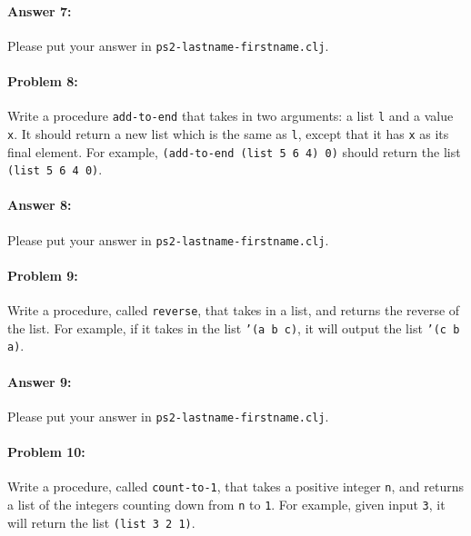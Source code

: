 \documentclass[10pt]{article}
\newcommand{\PSnum}{2}
\begin{document}
\paragraph{Answer 7:} Please put your answer in \texttt{ps\PSnum-lastname-firstname.clj}.

\noindent\hrulefill %

\paragraph{Problem 8:}
  Write a procedure \texttt{add-to-end} that takes in two arguments: a
  list \texttt{l} and a value \texttt{x}. It should return a new list
  which is the same as \texttt{l}, except that it has \texttt{x} as
  its final element. For example, \texttt{(add-to-end (list 5 6 4) 0)}
  should return the list \texttt{(list 5 6 4 0)}.

\paragraph{Answer 8:} Please put your answer in \texttt{ps\PSnum-lastname-firstname.clj}.

\noindent\hrulefill %

\paragraph{Problem 9:}
  Write a procedure, called \texttt{reverse}, that takes in a list, and returns
  the reverse of the list. For example, if it takes in the list \texttt{'(a b c)}, it will output the list \texttt{'(c b a)}.

\paragraph{Answer 9:} Please put your answer in \texttt{ps\PSnum-lastname-firstname.clj}.

\noindent\hrulefill %

\paragraph{Problem 10:}
  Write a procedure, called \texttt{count-to-1}, that takes a positive
  integer \texttt{n}, and returns a list of the integers counting down
  from \texttt{n} to \texttt{1}. For example, given input \texttt{3},
  it will return the list \texttt{(list 3 2 1)}.
\end{document}
